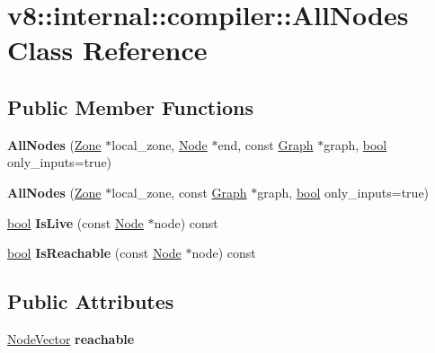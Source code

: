 \hypertarget{classv8_1_1internal_1_1compiler_1_1AllNodes}{}\section{v8\+:\+:internal\+:\+:compiler\+:\+:All\+Nodes Class Reference}
\label{classv8_1_1internal_1_1compiler_1_1AllNodes}
\subsection*{Public Member Functions}
\begin{DoxyCompactItemize}
\item 
\mbox{\label{classv8_1_1internal_1_1compiler_1_1AllNodes_af6c9f4bce71577567a78e723bf059427}} 
{\bfseries All\+Nodes} (\mbox{\hyperlink{classv8_1_1internal_1_1Zone}{Zone}} $\ast$local\+\_\+zone, \mbox{\hyperlink{classv8_1_1internal_1_1compiler_1_1Node}{Node}} $\ast$end, const \mbox{\hyperlink{classv8_1_1internal_1_1compiler_1_1Graph}{Graph}} $\ast$graph, \mbox{\hyperlink{classbool}{bool}} only\+\_\+inputs=true)
\item 
\mbox{\label{classv8_1_1internal_1_1compiler_1_1AllNodes_a6afc8a2db2e9dc39b954e8aef5de04ce}} 
{\bfseries All\+Nodes} (\mbox{\hyperlink{classv8_1_1internal_1_1Zone}{Zone}} $\ast$local\+\_\+zone, const \mbox{\hyperlink{classv8_1_1internal_1_1compiler_1_1Graph}{Graph}} $\ast$graph, \mbox{\hyperlink{classbool}{bool}} only\+\_\+inputs=true)
\item 
\mbox{\label{classv8_1_1internal_1_1compiler_1_1AllNodes_a631f6ac405ff5a229b4c4f064db1a80c}} 
\mbox{\hyperlink{classbool}{bool}} {\bfseries Is\+Live} (const \mbox{\hyperlink{classv8_1_1internal_1_1compiler_1_1Node}{Node}} $\ast$node) const
\item 
\mbox{\label{classv8_1_1internal_1_1compiler_1_1AllNodes_ad46377ff423cb080e085e00c301926dc}} 
\mbox{\hyperlink{classbool}{bool}} {\bfseries Is\+Reachable} (const \mbox{\hyperlink{classv8_1_1internal_1_1compiler_1_1Node}{Node}} $\ast$node) const
\end{DoxyCompactItemize}
\subsection*{Public Attributes}
\begin{DoxyCompactItemize}
\item 
\mbox{\label{classv8_1_1internal_1_1compiler_1_1AllNodes_a511486b5db493d5fa52e0e81947d0065}} 
\mbox{\hyperlink{classv8_1_1internal_1_1ZoneVector}{Node\+Vector}} {\bfseries reachable}
\end{DoxyCompactItemize}



